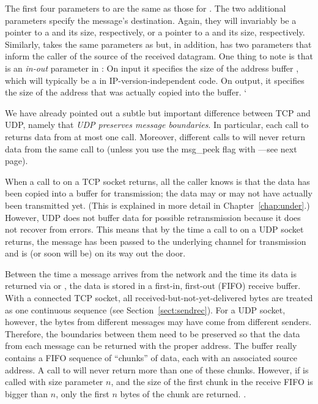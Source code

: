 The first four parameters to  are the same
as those
for .  The two additional parameters specify the
message's destination.  Again, they will
invariably be a pointer to a  and
its size, respectively, or a pointer to
a  and its size, respectively.
%
Similarly,  takes the same  parameters  as
 but, in addition, has two parameters that inform
the caller of the source of the received datagram.
One thing to note is that  is an
\emph{in-out} parameter in :
On input it specifies the size of the
address buffer , which will typically be a
 in IP-version-independent code.
On output, it specifies the size of the
address that was actually copied into the buffer.
`

We have already pointed out a
subtle but important difference between TCP and UDP, namely that
\emph{UDP preserves message boundaries}.
In particular, each call to 
returns data from at most one  call.
Moreover, different calls
to  will never return data from the same
call to 
(unless you use the msg\_peek
flag with ---see next page).

When a call to  on a TCP socket returns, all the caller
knows is that the data has been copied into a buffer for transmission; the
data may or may not have actually been transmitted yet. (This is explained
in more detail in Chapter~\ref{chap:under}.)
However, UDP does not buffer data for possible retransmission because
it does not recover from errors.
This means that by the time a call to  on a
UDP socket returns, the message has been passed to the underlying
channel for transmission and is (or soon will be) on its way out the
door.

Between the time a message arrives from the network and the time its
data is returned via  or
, the
data is stored in a first-in, first-out (FIFO) receive buffer.  With a 
connected TCP socket, all
received-but-not-yet-delivered bytes are treated as one continuous sequence
(see Section~\ref{sect:sendrec}).  For a UDP socket,
however, the bytes from different messages may have come from
different senders.  Therefore, the boundaries between them need to be
preserved so that the data from each message can be returned with the
proper address.  The buffer really contains a FIFO sequence of ``chunks''
of data, each with an associated source address.  A call to
 will never return more than one of these
chunks.  However, if  is called with size parameter
$n$, and the size of the first chunk in the receive FIFO is bigger than
$n$, only the first $n$ bytes of the chunk are returned.  .

